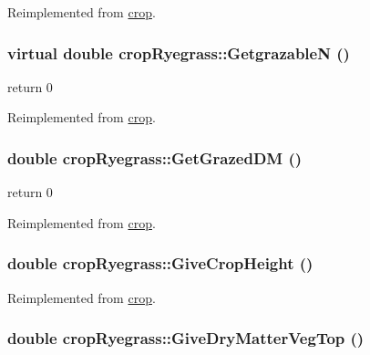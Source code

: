 Reimplemented from \hyperlink{classcrop_aed591b1785dede13c062ab0af439a902}{crop}.\hypertarget{classcrop_ryegrass_a158a56a14a1b65c246b9dc87b736feb0}{
\subsubsection[{GetgrazableN}]{\setlength{\rightskip}{0pt plus 5cm}virtual double cropRyegrass::GetgrazableN ()}}
\label{classcrop_ryegrass_a158a56a14a1b65c246b9dc87b736feb0}


return 0 

Reimplemented from \hyperlink{classcrop_a771d3a2885d168f4f06686cc7868cad8}{crop}.\hypertarget{classcrop_ryegrass_a02c5bec33e0f0a6240c34dde03a09e01}{
\subsubsection[{GetGrazedDM}]{\setlength{\rightskip}{0pt plus 5cm}double cropRyegrass::GetGrazedDM ()}}
\label{classcrop_ryegrass_a02c5bec33e0f0a6240c34dde03a09e01}


return 0 

Reimplemented from \hyperlink{classcrop_a1aafdf75bbeabd5e961678d20b487976}{crop}.\hypertarget{classcrop_ryegrass_ad5e9c54a99aa929e1ecab9c7146b6b09}{
\subsubsection[{GiveCropHeight}]{\setlength{\rightskip}{0pt plus 5cm}double cropRyegrass::GiveCropHeight ()}}
\label{classcrop_ryegrass_ad5e9c54a99aa929e1ecab9c7146b6b09}


Reimplemented from \hyperlink{classcrop_a75948813cda562087a4ba9474a5906c6}{crop}.\hypertarget{classcrop_ryegrass_aedd4ae77832a94a71902085022f1eb88}{
\subsubsection[{GiveDryMatterVegTop}]{\setlength{\rightskip}{0pt plus 5cm}double cropRyegrass::GiveDryMatterVegTop ()}}
\label{classcrop_ryegrass_aedd4ae77832a94a71902085022f1eb88}


